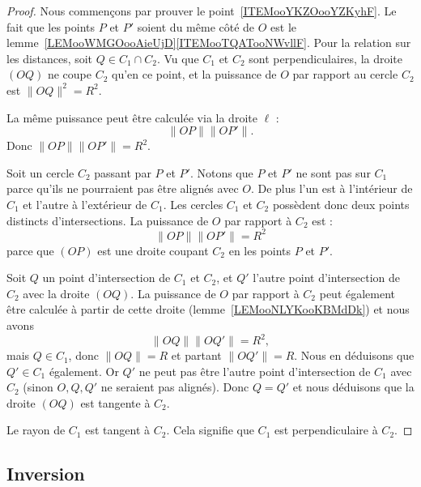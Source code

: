 \begin{proof}
	Nous commençons par prouver le point~\ref{ITEMooYKZOooYZKyhF}. Le fait que les points \( P\) et \( P'\) soient du même côté de \( O\) est le lemme~\ref{LEMooWMGOooAieUjD}\ref{ITEMooTQATooNWvllF}. Pour la relation sur les distances, soit \( Q\in C_1\cap C_2\). Vu que \( C_1\) et \( C_2\) sont perpendiculaires, la droite \( (OQ)\) ne coupe \( C_2\) qu'en ce point, et la puissance de \( O\) par rapport au cercle \( C_2\) est \( \| OQ \|^2=R^2\).

	La même puissance peut être calculée via la droite \( \ell\) :
	\begin{equation}
		\| OP \|\| OP' \|.
	\end{equation}
	Donc \( \| OP \|\| OP' \|=R^2\).

	Soit un cercle \( C_2\) passant par \( P\) et \( P'\). Notons que \( P\) et \( P'\) ne sont pas sur \( C_1\) parce qu'ils ne pourraient pas être alignés avec \( O\). De plus l'un est à l'intérieur de \( C_1\) et l'autre à l'extérieur de \( C_1\). Les cercles \( C_1\) et \( C_2\) possèdent donc deux points distincts d'intersections.
	La puissance de \( O\) par rapport à \( C_2\) est :
	\begin{equation}
		\| OP \|\| OP' \|=R^2
	\end{equation}
	parce que \( (OP)\) est une droite coupant \( C_2\) en les points \( P\) et \( P'\).

	Soit \( Q\) un point d'intersection de \( C_1\) et \( C_2\), et \( Q'\) l'autre point d'intersection de \( C_2\) avec la droite \( (OQ)\). La puissance de \( O\) par rapport à \( C_2\) peut également être calculée à partir de cette droite (lemme~\ref{LEMooNLYKooKBMdDk}) et nous avons
	\begin{equation}
		\| OQ \|\| OQ' \|=R^2,
	\end{equation}
	mais \( Q\in C_1\), donc \( \| OQ \|=R\) et partant \( \| OQ' \|=R\). Nous en déduisons que \( Q'\in C_1\) également. Or \( Q'\) ne peut pas être l'autre point d'intersection de \( C_1\) avec \( C_2\) (sinon \( O,Q,Q'\) ne seraient pas alignés). Donc \( Q=Q'\) et nous déduisons que la droite \( (OQ)\) est tangente à \( C_2\).

	Le rayon de \( C_1\) est tangent à \( C_2\). Cela signifie que \( C_1\) est perpendiculaire à \( C_2\).
\end{proof}

\subsection{Inversion}

